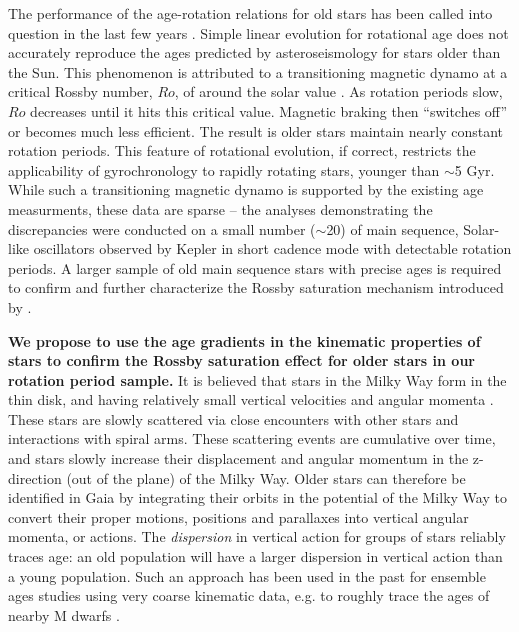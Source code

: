 \documentclass[12pt]{article}
\newcommand{\eg}{{\it e.g.}}
\begin{document}
The performance of the age-rotation relations for old
stars has been called into question in the last few years
\citep{angus2015,van-saders2016, Metcalfe2016}.
Simple linear evolution for rotational age does not accurately reproduce the ages
predicted by asteroseismology for stars older than the Sun.
This phenomenon is attributed to a transitioning magnetic dynamo at a critical
Rossby number, $Ro$, of around the solar value \citep{van-saders2016}.
As rotation periods slow, $Ro$ decreases until it hits this critical value. Magnetic braking then ``switches off'' or becomes much less efficient. The result is older stars maintain nearly constant rotation periods. This feature of rotational evolution, if correct, restricts the applicability
of gyrochronology to rapidly rotating stars, younger than $\sim$5 Gyr.
While such a transitioning magnetic dynamo is supported by the existing age measurments, 
these data are sparse -- the analyses demonstrating the discrepancies were
conducted on a small number ($\sim$20) of main sequence, Solar-like oscillators observed
by Kepler in short cadence mode with detectable rotation periods.
A larger sample of old main sequence stars with precise ages is required to
confirm and further characterize the Rossby saturation mechanism introduced by
\citep{van-saders2016}.

{\bf We propose to use the age gradients in the kinematic properties of stars to
confirm the Rossby saturation effect for older stars in our rotation period sample.}
It is believed that stars in the Milky Way form in the thin disk, and having relatively small vertical velocities and angular momenta
\citep[\eg][]{carlberg1985, edvardsson1993, freeman2002, bensby2004,
holmberg2007}.
These stars are slowly scattered via close encounters with other stars and
interactions with spiral arms.
These scattering events are cumulative over time, and stars slowly
increase their displacement and angular momentum in the z-direction (out of the
plane) of the Milky Way.
Older stars can therefore be identified in Gaia by integrating their orbits in the
potential of the Milky Way to convert their proper motions, positions and
parallaxes into vertical angular momenta, or actions.
The {\it dispersion} in vertical action for groups of stars reliably traces
age: an old population will have a larger dispersion in vertical action than a
young population. Such an approach has been used in the past for ensemble ages studies using very coarse kinematic data, e.g. to roughly trace the ages of nearby M dwarfs \citep{bochanski_gal}.
\end{document}
